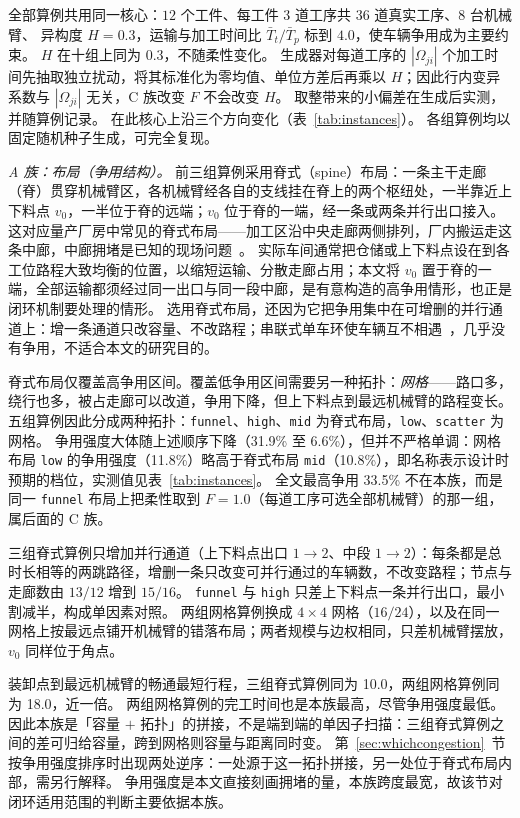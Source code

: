 \documentclass[manuscript,screen,review]{acmart}
\newcommand{\ContentionLo}{6.6\%}
\newcommand{\ContentionHi}{33.5\%}
\newcommand{\ContentionAHi}{31.9\%}
\newcommand{\ContentionALow}{11.8\%}
\newcommand{\ContentionAMid}{10.8\%}
\newcommand{\LegDumbbell}{10.0}          %
\newcommand{\LegGrid}{18.0}              %
\begin{document}
全部算例共用同一核心：$12$ 个工件、每工件 $3$ 道工序共 $36$ 道真实工序、$8$ 台机械臂、
异构度 $H=0.3$，运输与加工时间比 $\bar{T}_t/\bar{T}_p$ 标到 $4.0$，使车辆争用成为主要约束。
$H$ 在十组上同为 $0.3$，不随柔性变化。
生成器对每道工序的 $|\Omega_{ji}|$ 个加工时间先抽取独立扰动，将其标准化为零均值、单位方差后再乘以 $H$；因此行内变异系数与 $|\Omega_{ji}|$ 无关，C 族改变 $F$ 不会改变 $H$。
取整带来的小偏差在生成后实测，并随算例记录。
在此核心上沿三个方向变化（表~\ref{tab:instances}）。
各组算例均以固定随机种子生成，可完全复现。

\emph{A 族：布局（争用结构）。}
前三组算例采用脊式（spine）布局：一条主干走廊（脊）贯穿机械臂区，各机械臂经各自的支线挂在脊上的两个枢纽处，一半靠近上下料点 $v_0$，一半位于脊的远端；$v_0$ 位于脊的一端，经一条或两条并行出口接入。
这对应量产厂房中常见的脊式布局——加工区沿中央走廊两侧排列，厂内搬运走这条中廊，中廊拥堵是已知的现场问题~\cite{suh2022spine}。
实际车间通常把仓储或上下料点设在到各工位路程大致均衡的位置，以缩短运输、分散走廊占用；本文将 $v_0$ 置于脊的一端，全部运输都须经过同一出口与同一段中廊，是有意构造的高争用情形，也正是闭环机制要处理的情形。
选用脊式布局，还因为它把争用集中在可增删的并行通道上：增一条通道只改容量、不改路程；串联式单车环使车辆互不相遇~\cite{rahimikelarijani2020tandem}，几乎没有争用，不适合本文的研究目的。

脊式布局仅覆盖高争用区间。覆盖低争用区间需要另一种拓扑：\emph{网格}——路口多，绕行也多，被占走廊可以改道，争用下降，但上下料点到最远机械臂的路程变长。
五组算例因此分成两种拓扑：\texttt{funnel}、\texttt{high}、\texttt{mid} 为脊式布局，\texttt{low}、\texttt{scatter} 为网格。
争用强度大体随上述顺序下降（\ContentionAHi{} 至 \ContentionLo{}），但并不严格单调：网格布局 \texttt{low} 的争用强度（\ContentionALow{}）略高于脊式布局 \texttt{mid}（\ContentionAMid{}），即名称表示设计时预期的档位，实测值见表~\ref{tab:instances}。
全文最高争用 \ContentionHi{} 不在本族，而是同一 \texttt{funnel} 布局上把柔性取到 $F=1.0$（每道工序可选全部机械臂）的那一组，属后面的 C 族。

三组脊式算例只增加并行通道（上下料点出口 $1\to2$、中段 $1\to2$）：每条都是总时长相等的两跳路径，增删一条只改变可并行通过的车辆数，不改变路程；节点与走廊数由 $13/12$ 增到 $15/16$。
\texttt{funnel} 与 \texttt{high} 只差上下料点一条并行出口，最小割减半，构成单因素对照。
两组网格算例换成 $4\times4$ 网格（$16/24$），以及在同一网格上按最远点铺开机械臂的错落布局；两者规模与边权相同，只差机械臂摆放，$v_0$ 同样位于角点。

装卸点到最远机械臂的畅通最短行程，三组脊式算例同为 \LegDumbbell{}，两组网格算例同为 \LegGrid{}，近一倍。
两组网格算例的完工时间也是本族最高，尽管争用强度最低。
因此本族是「容量 $+$ 拓扑」的拼接，不是端到端的单因子扫描：三组脊式算例之间的差可归给容量，跨到网格则容量与距离同时变。
第~\ref{sec:whichcongestion}~节按争用强度排序时出现两处逆序：一处源于这一拓扑拼接，另一处位于脊式布局内部，需另行解释。
争用强度是本文直接刻画拥堵的量，本族跨度最宽，故该节对闭环适用范围的判断主要依据本族。
\end{document}
